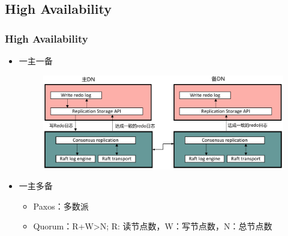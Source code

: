 \subsection{High Availability}

\begin{frame}[fragile]
	\frametitle{High Availability}
	\begin{itemize}
		\item 一主一备
		\begin{figure}
			\includegraphics[width=.7\linewidth]{figs/dbfile-ha.pdf}
		\end{figure}
		\item 一主多备
		\begin{itemize}
			\item Paxos：多数派
			\item Quorum：R+W>N; R: 读节点数，W：写节点数，N：总节点数
		\end{itemize}
	\end{itemize}
\end{frame}

% 
% 
% 


